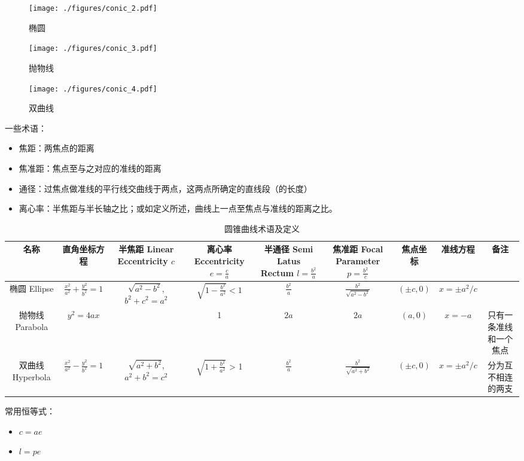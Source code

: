 \begin{figure}[ht]
\centering
\texttt{[image: ./figures/conic\_2.pdf]}
\caption{椭圆} \label{conic_fig2}
\end{figure}

\begin{figure}[ht]
\centering
\texttt{[image: ./figures/conic\_3.pdf]}
\caption{抛物线} \label{conic_fig3}
\end{figure}

\begin{figure}[ht]
\centering
\texttt{[image: ./figures/conic\_4.pdf]}
\caption{双曲线} \label{conic_fig4}
\end{figure}

一些术语：
\begin{itemize}
\item 焦距：两焦点的距离
\item 焦准距：焦点至与之对应的准线的距离
\item 通径：过焦点做准线的平行线交曲线于两点，这两点所确定的直线段（的长度）
\item 离心率：半焦距与半长轴之比；或如定义所述，曲线上一点至焦点与准线的距离之比。
\end{itemize}

\begin{table}[ht]
\centering
\caption{圆锥曲线术语及定义}\label{conic_tab1}
\begin{tabular}{|c|c|c|c|c|c|c|c|c|}
\hline
名称 & 直角坐标方程 & 半焦距 Linear Eccentricity $c$ & 离心率 Eccentricity $e = \frac{c}{a}$ & 半通径 Semi Latus Rectum $l=\frac{b^2}{a}$ & 焦准距 Focal Parameter$p=\frac{b^2}{c}$ & 焦点坐标&准线方程 &备注\\
\hline
椭圆 Ellipse & $\frac{x^2}{a^2} + \frac{y^2}{b^2} = 1$ & $\sqrt{a^2-b^2}$, $b^2+c^2=a^2$ & $\sqrt{1-\frac{b^2}{a^2}} < 1$ & $\frac{b^2}{a}$ & $\frac{b^2}{\sqrt{a^2-b^2}}$ & $(\pm c,0)$ & $x=\pm a^2/c$& \\
\hline
抛物线 Parabola & $y^2=4ax$ & \ & 1 & $2a$ & $2a$ & $(a,0)$ & $x=-a$ & 只有一条准线和一个焦点\\
\hline
双曲线 Hyperbola & $\frac{x^2}{a^2} - \frac{y^2}{b^2} = 1$ & $\sqrt{a^2+b^2}$,$a^2+b^2=c^2$ & $\sqrt{1+\frac{b^2}{a^2}}$ > 1 & $\frac{b^2}{a}$ & $\frac{b^2}{\sqrt{a^2+b^2}}$ & $(\pm c,0)$ & $x=\pm a^2/c$ & 分为互不相连的两支 \\
\hline
\end{tabular}
\end{table}

常用恒等式：
\begin{itemize}
\item $c=ae$
\item $l=pe$
\end{itemize}
